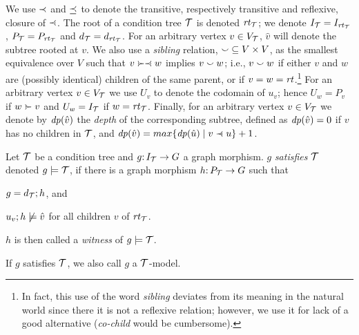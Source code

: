 We use $\prec$ and $\preceq$ to denote the transitive, respectively transitive and reflexive, closure of $\parentof$. The root of a condition tree ${\mathcal{T}}$ is denoted $\mathit{rt}_{{\mathcal{T}}}$; we denote $I_{\mathcal{T}}=I_{\mathit{rt}_{{\mathcal{T}}}}$, $P_{\mathcal{T}}=P_{\mathit{rt}_{{\mathcal{T}}}}$ and $d_{\mathcal{T}}=d_{\mathit{rt}_{{\mathcal{T}}}}$. For an arbitrary vertex $v\in V_{\mathcal{T}}$, $\hat v$ will denote the subtree rooted at $v$. We also use a \emph{sibling} relation, ${\smallsmile}\subseteq V\times V$, as the smallest equivalence over $V$ such that $v\childof\parentof w$ implies $v\smallsmile w$; i.e., $v\smallsmile w$ if either $v$ and $w$ are (possibly identical) children of the same parent, or if $v=w=\mathit{rt}$.\footnote{In fact, this use of the word \emph{sibling} deviates from its meaning in the natural world since there it is not a reflexive relation; however, we use it for lack of a good alternative (\emph{co-child} would be cumbersome).} For an arbitrary vertex $v\in V_{\mathcal{T}}$ we use $U_v$ to denote the codomain of $u_v$; hence $U_w=P_v$ if $w\childof v$ and $U_w=I_{\mathcal{T}}$ if $w=\mathit{rt}_{{\mathcal{T}}}$.
Finally, for an arbitrary vertex $v\in V_{\mathcal{T}}$ we denote by ${\mathit{dp}}(\hat v)$ the \emph{depth} of the corresponding subtree, defined as ${\mathit{dp}}(\hat v) = 0$ if $v$ has no children in ${\mathcal{T}}$, and $\depth(\hat v) = max \{\depth(\hat u) \mid v \parentof u\} + 1$.

\begin{definition}[satisfaction]\label{def:satisfaction}
Let ${\mathcal{T}}$ be a condition tree and $g{:}\, I_{\mathcal{T}}\rightarrow G$ a graph morphism. $g$ \emph{satisfies ${\mathcal{T}}$} denoted $g\models {\mathcal{T}}$, if there is a graph morphism $h{:}\, P_{\mathcal{T}}\rightarrow G$ such that
\begin{inumerate}
\item $g=d_{\mathcal{T}};h$, and 
\item $u_v;h\not\models \hat v$ for all children $v$ of $\mathit{rt}_{{\mathcal{T}}}$.
\end{inumerate}
$h$ is then called a \emph{witness} of $g\models {\mathcal{T}}$.
\end{definition}
%
If $g$ satisfies ${\mathcal{T}}$, we also call $g$ a ${\mathcal{T}}$-model.


